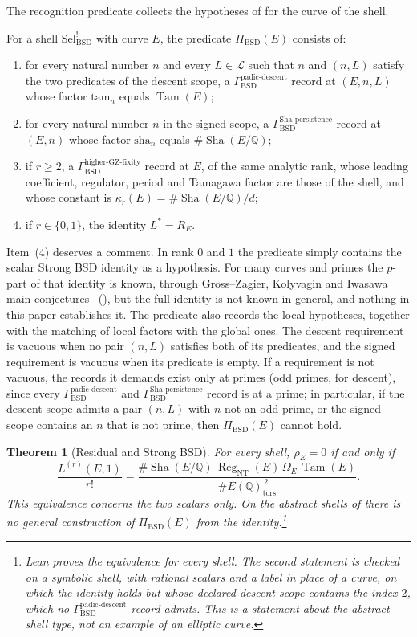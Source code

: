 \documentclass[11pt]{article}
\newtheorem{theorem}{Theorem}[section]
\theoremstyle{definition}
\newcommand{\Q}{\mathbb{Q}}
\newcommand{\Sha}{\operatorname{Sha}}
\newcommand{\Reg}{\operatorname{Reg}}
\newcommand{\Tam}{\operatorname{Tam}}
\newcommand{\tors}{\operatorname{tors}}
\newcommand{\kapr}{\kappa_r}
\newcommand{\SelBSD}{\mathrm{Sel}^{!}_{\mathrm{BSD}}}   \newcommand{\rhoE}{\rho_E}                              \newcommand{\PiBSD}{\Pi_{\mathrm{BSD}}}                 \newcommand{\GammaPD}{\Gamma_{\mathrm{BSD}}^{\mathrm{padic\text{-}descent}}}
\newcommand{\GammaSP}{\Gamma_{\mathrm{BSD}}^{\mathrm{Sha\text{-}persistence}}}
\newcommand{\GammaGZ}{\Gamma_{\mathrm{BSD}}^{\mathrm{higher\text{-}GZ\text{-}fixity}}}
\begin{document}
The recognition predicate collects the hypotheses of
 for the curve of the shell.

\begin{definition}[Recognition predicate $\PiBSD$]\label{def:closure:pi-bsd}
For a shell $\SelBSD$ with curve $E$, the predicate $\PiBSD(E)$ consists
of:
\begin{enumerate}
\item for every natural number $n$ and every $L\in\mathcal L$ such that
  $n$ and $(n,L)$ satisfy the two predicates of the descent scope, a
  $\GammaPD$ record at $(E,n,L)$ whose factor $\mathrm{tam}_n$ equals
  $\Tam(E)$;
\item for every natural number $n$ in the signed scope, a $\GammaSP$
  record at $(E,n)$ whose factor $\mathrm{sha}_n$ equals
  $\#\Sha(E/\Q)$;
\item if $r\ge2$, a $\GammaGZ$ record at $E$, of the same analytic rank,
  whose leading coefficient, regulator, period and Tamagawa factor are
  those of the shell, and whose constant is
  $\kapr(E)=\#\Sha(E/\Q)/d$;
\item if $r\in\{0,1\}$, the identity $L^*=R_E$.
\end{enumerate}
\end{definition}

Item~(4) deserves a comment.  In rank $0$ and $1$ the predicate simply
contains the scalar Strong BSD identity as a hypothesis.  For many curves
and primes the $p$-part of that identity is known, through
Gross--Zagier, Kolyvagin and Iwasawa main
conjectures~\citep{GrossZagier1986,Kolyvagin1989,SkinnerUrban2014}
(), but the full identity is not known in general,
and nothing in this paper establishes it.  The predicate also records the local hypotheses, together with the
matching of local factors with the global ones.  The descent requirement
is vacuous when no pair $(n,L)$ satisfies both of its predicates, and the
signed requirement is vacuous when its predicate is empty.  If a
requirement is not vacuous, the records it demands exist only at primes
(odd primes, for descent), since every $\GammaPD$ and $\GammaSP$ record
is at a prime; in particular, if the descent scope admits a pair $(n,L)$
with $n$ not an odd prime, or the signed scope contains an $n$ that is not
prime, then $\PiBSD(E)$ cannot hold.

\begin{theorem}[Residual and Strong BSD]\label{thm:closure:pi-bsd-iff-strong-bsd}
For every shell, $\rhoE=0$ if and only if
\[
  \frac{L^{(r)}(E,1)}{r!}
  =
  \frac{\#\Sha(E/\Q)\,\Reg_{\mathrm{NT}}(E)\,\Omega_E\,\Tam(E)}
       {\#E(\Q)_{\tors}^{\,2}} .
\]
This equivalence concerns the two scalars only.  On the abstract shells
of  there is no general construction of
$\PiBSD(E)$ from the identity.\footnote{Lean proves the equivalence for every shell.  The second
statement is checked on a symbolic shell, with rational scalars and a
label in place of a curve, on which the identity holds but whose declared
descent scope contains the index $2$, which no $\GammaPD$ record admits.
This is a statement about the abstract shell type, not an example of an
elliptic curve.}
\end{theorem}
\end{document}
